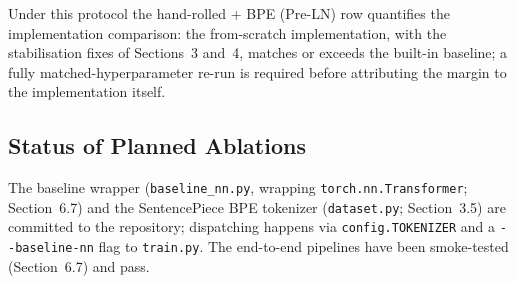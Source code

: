 \begin{table}[h]
\centering
{}
\caption{Baseline comparison on the Tatoeba EN$\rightarrow$DE test set. Rows differ in more than one factor (tokenization, LN convention, epochs, batch, warmup), so the 12$\times$ drop in validation perplexity from the word-level diagnostic (149.84) to the BPE configurations (12.39 and 9.29) reflects the joint effect of subword tokenization, Pre-LN stabilisation, corrected warmup, and longer training; it does not isolate any single factor. The 5.7 BLEU margin over the baseline (38.30 $\rightarrow$ 44.00) additionally mixes implementation and schedule effects (Section~6.7). Beam search (beam = 4) adds a further +1.3 BLEU over greedy decoding on the hand-rolled model.}
\label{tab:baseline-results}
\end{table}

Under this protocol the hand-rolled + BPE (Pre-LN) row quantifies the implementation comparison: the from-scratch implementation, with the stabilisation fixes of Sections~3 and~4, matches or exceeds the built-in baseline; a fully matched-hyperparameter re-run is required before attributing the margin to the implementation itself.

\subsection{Status of Planned Ablations}

The baseline wrapper (\texttt{baseline\_nn.py}, wrapping \texttt{torch.nn.Transformer}; Section~6.7) and the SentencePiece BPE tokenizer (\texttt{dataset.py}; Section~3.5) are committed to the repository; dispatching happens via \texttt{config.TOKENIZER} and a \texttt{-{}-baseline-nn} flag to \texttt{train.py}. The end-to-end pipelines have been smoke-tested (Section~6.7) and pass.

